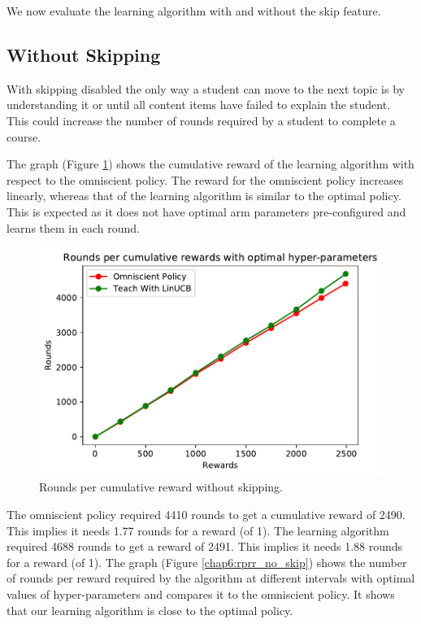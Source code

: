 We now evaluate the learning algorithm with and without the skip feature. 

\subsection{Without Skipping}

With skipping disabled the only way a student can move to the next topic is by understanding it or until all content items have failed to explain the student. This could increase the number of rounds required by a student to complete a course. \par 

The graph (Figure \ref{cr_withoutSkip}) shows the cumulative reward of the learning algorithm with respect to the omniscient policy. The reward for the omniscient policy increases linearly, whereas that of the learning algorithm is similar to the optimal policy. This is expected as it does not have optimal arm parameters pre-configured and learns them in each round. 


\begin{figure}[h]
    \centering
    \includegraphics[scale=1.0]{Figures/rounds_per_reward_no_skipping.pdf}
    \caption{Rounds per cumulative reward without skipping.}
    \label{cr_withoutSkip}
\end{figure}

The omniscient policy required 4410 rounds to get a cumulative reward of 2490. This implies it needs 1.77 rounds for a reward (of 1). The learning algorithm required 4688 rounds to get a reward of 2491. This implies it needs 1.88 rounds for a reward (of 1). The graph (Figure \ref{chap6:rprr_no_skip}) shows the number of rounds per reward required by the algorithm at different intervals with optimal values of hyper-parameters and compares it to the omniscient policy. It shows that our learning algorithm is close to the optimal policy. \par

